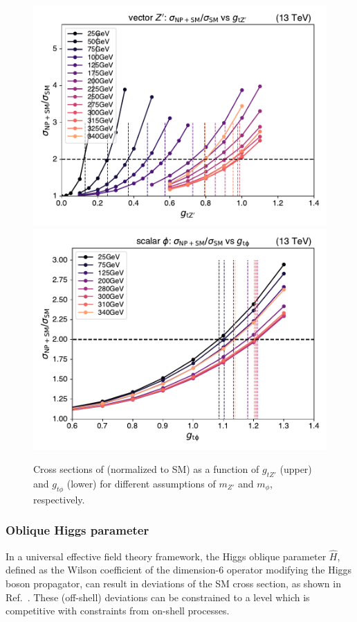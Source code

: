 \begin{figure}[!htbp]
    \centering
    \includegraphics[width=0.78\linewidth]{figs/ftan/plot_xsec_zprime.pdf} \\
    \includegraphics[width=0.78\linewidth]{figs/ftan/plot_xsec_phi.pdf}
    \caption{
        Cross sections of \tttt (normalized to SM) as a function of $g_{tZ'}$ (upper)
        and $g_{t\phi}$ (lower) for different assumptions of $m_{Z'}$ and $m_{\phi}$,
        respectively.
    }
    \label{fig:cross_section_zprimephi}
\end{figure}

\subsubsection{Oblique Higgs parameter}

In a universal effective field theory framework, the Higgs oblique
parameter $\hat H$, defined as the Wilson coefficient of the dimension-6
operator modifying the Higgs boson propagator, can result in deviations of the
SM \tttt cross section, as shown in Ref.~\cite{THEORY:ObliqueHiggs2019}.  These
(off-shell) deviations can be constrained to a level which is competitive with
constraints from on-shell processes.

